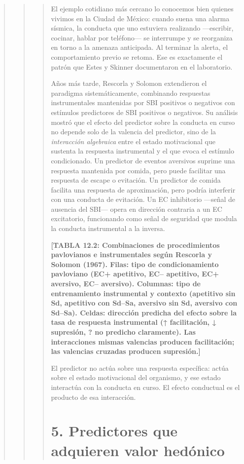 \documentclass[
  letterpaper,
  DIV=11,
  numbers=noendperiod]{scrreprt}
\begin{document}
\begin{tcolorbox}[enhanced jigsaw, toprule=.15mm, arc=.35mm, colback=white, opacityback=0, colframe=quarto-callout-note-color-frame, breakable, rightrule=.15mm, left=2mm, leftrule=.75mm, bottomrule=.15mm]
\begin{quote}
\begin{quote}
\begin{quote}
El ejemplo cotidiano más cercano lo conocemos bien quienes vivimos en la
Ciudad de México: cuando suena una alarma sísmica, la conducta que uno
estuviera realizando ---escribir, cocinar, hablar por teléfono--- se
interrumpe y se reorganiza en torno a la amenaza anticipada. Al terminar
la alerta, el comportamiento previo se retoma. Ese es exactamente el
patrón que Estes y Skinner documentaron en el laboratorio.

Años más tarde, Rescorla y Solomon extendieron el paradigma
sistemáticamente, combinando respuestas instrumentales mantenidas por
SBI positivos o negativos con estímulos predictores de SBI positivos o
negativos. Su análisis mostró que el efecto del predictor sobre la
conducta en curso no depende solo de la valencia del predictor, sino de
la \emph{interacción algebraica} entre el estado motivacional que
sustenta la respuesta instrumental y el que evoca el estímulo
condicionado. Un predictor de eventos aversivos suprime una respuesta
mantenida por comida, pero puede facilitar una respuesta de escape o
evitación. Un predictor de comida facilita una respuesta de
aproximación, pero podría interferir con una conducta de evitación. Un
EC inhibitorio ---señal de ausencia del SBI--- opera en dirección
contraria a un EC excitatorio, funcionando como señal de seguridad que
modula la conducta instrumental a la inversa.

\textbf{{[}TABLA 12.2: Combinaciones de procedimientos pavlovianos e
instrumentales según Rescorla y Solomon (1967). Filas: tipo de
condicionamiento pavloviano (EC+ apetitivo, EC-- apetitivo, EC+
aversivo, EC-- aversivo). Columnas: tipo de entrenamiento instrumental y
contexto (apetitivo sin Sd, apetitivo con Sd--Sa, aversivo sin Sd,
aversivo con Sd--Sa). Celdas: dirección predicha del efecto sobre la
tasa de respuesta instrumental (↑ facilitación, ↓ supresión, ? no
predicho claramente). Las interacciones mismas valencias producen
facilitación; las valencias cruzadas producen supresión.{]}}

El predictor no actúa sobre una respuesta específica: actúa sobre el
estado motivacional del organismo, y ese estado interactúa con la
conducta en curso. El efecto conductual es el producto de esa
interacción.

\section{5. Predictores que adquieren valor
hedónico}\label{predictores-que-adquieren-valor-heduxf3nico}


\end{quote}
\end{quote}
\end{quote}
\end{tcolorbox}
\end{document}
